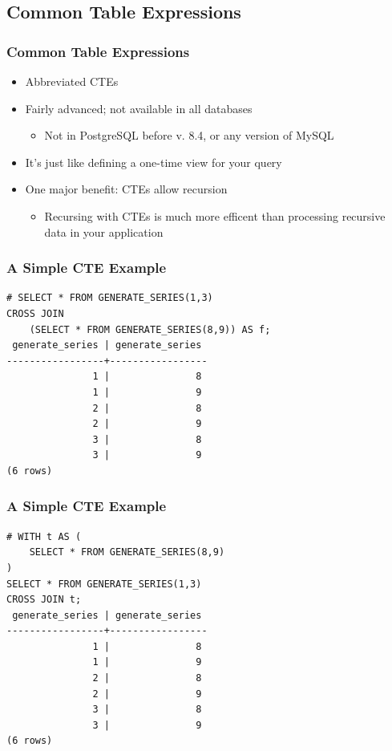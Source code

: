 \documentclass{beamer}
\begin{document}
\subsection{Common Table Expressions}
\begin{frame}
    \frametitle{Common Table Expressions}
    \begin{itemize}
        \item Abbreviated CTEs
        \item Fairly advanced; not available in all databases
        \begin{itemize}
            \item Not in PostgreSQL before v. 8.4, or any version of MySQL
        \end{itemize}
        \item It's just like defining a one-time view for your query
        \item One major benefit: CTEs allow recursion
        \begin{itemize}
            \item Recursing with CTEs is much more efficent than processing recursive data in your application
        \end{itemize}
    \end{itemize}
\end{frame}

\begin{frame}[fragile]
    \frametitle{A Simple CTE Example}
    \begin{verbatim}
# SELECT * FROM GENERATE_SERIES(1,3)
CROSS JOIN
    (SELECT * FROM GENERATE_SERIES(8,9)) AS f;
 generate_series | generate_series
-----------------+-----------------
               1 |               8
               1 |               9
               2 |               8
               2 |               9
               3 |               8
               3 |               9
(6 rows)
    \end{verbatim}
\end{frame}

\begin{frame}[fragile]
    \frametitle{A Simple CTE Example}
    \begin{verbatim}
# WITH t AS (
    SELECT * FROM GENERATE_SERIES(8,9)
)
SELECT * FROM GENERATE_SERIES(1,3)
CROSS JOIN t;
 generate_series | generate_series
-----------------+-----------------
               1 |               8
               1 |               9
               2 |               8
               2 |               9
               3 |               8
               3 |               9
(6 rows)
    \end{verbatim}
\end{frame}
\end{document}
